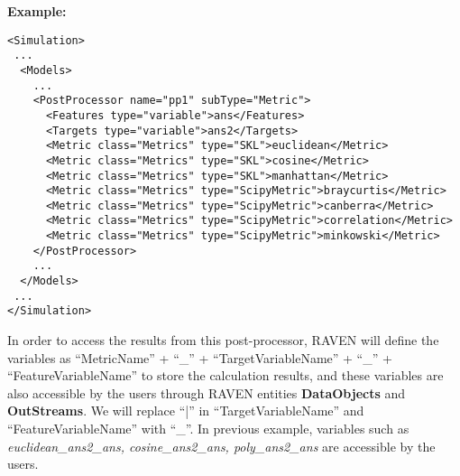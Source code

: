 \textbf{Example:}

\begin{lstlisting}[style=XML]
<Simulation>
 ...
  <Models>
    ...
    <PostProcessor name="pp1" subType="Metric">
      <Features type="variable">ans</Features>
      <Targets type="variable">ans2</Targets>
      <Metric class="Metrics" type="SKL">euclidean</Metric>
      <Metric class="Metrics" type="SKL">cosine</Metric>
      <Metric class="Metrics" type="SKL">manhattan</Metric>
      <Metric class="Metrics" type="ScipyMetric">braycurtis</Metric>
      <Metric class="Metrics" type="ScipyMetric">canberra</Metric>
      <Metric class="Metrics" type="ScipyMetric">correlation</Metric>
      <Metric class="Metrics" type="ScipyMetric">minkowski</Metric>
    </PostProcessor>
    ...
  </Models>
 ...
</Simulation>
\end{lstlisting}

In order to access the results from this post-processor, RAVEN will define the variables as ``MetricName'' +
``\_'' + ``TargetVariableName'' + ``\_'' + ``FeatureVariableName'' to store the calculation results, and these
variables are also accessible by the users through RAVEN entities \textbf{DataObjects} and \textbf{OutStreams}.
\nb We will replace ``|'' in ``TargetVariableName'' and ``FeatureVariableName'' with ``\_''.
In previous example, variables such as \textit{euclidean\_ans2\_ans, cosine\_ans2\_ans, poly\_ans2\_ans} are accessible
by the users.


